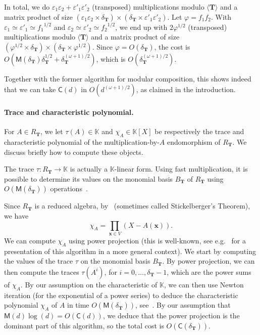 \documentclass[12pt]{article}
\def\CC {\ensuremath{\mathsf{C}}}
\def\K {\ensuremath{\mathbb{K}}}
\def\M {\ensuremath{\mathsf{M}}}
\def\Tt {\ensuremath{\mathbf{T}}}
\def\x {\ensuremath{\mathbf{x}}}
\begin{document}
In total, we do $\varepsilon_1 \varepsilon_2+\varepsilon'_1
\varepsilon'_2$ (transposed) multiplications modulo $\langle \Tt
\rangle$ and a matrix product of size $(\varepsilon_1 \varepsilon_2
\times \delta_\Tt) \times (\delta_\Tt \times \varepsilon'_1
\varepsilon'_2)$. Let $\varphi=f_1f_2$. With $\varepsilon_1 \simeq
\varepsilon'_1 \simeq {f_1}^{1/2}$ and $\varepsilon_2 \simeq
\varepsilon'_2 \simeq {f_2}^{1/2}$, we end up with $2\varphi^{1/2}$
(transposed) multiplications modulo $\langle \Tt \rangle$ and a matrix
product of size $ (\varphi^{1/2} \times \delta_\Tt) \times (\delta_\Tt
\times \varphi^{1/2})$. Since $\varphi=O(\delta_\Tt)$, the cost is
$O(\M(\delta_\Tt)\delta_\Tt^{1/2} + \delta_\Tt^{(\omega+1)/2})$, which
is $O(\delta_\Tt^{(\omega+1)/2})$.

Together with the former algorithm for modular composition, this shows
indeed that we can take $\CC(d)$ in $O(d^{(\omega+1)/2})$, as claimed
in the introduction.

\paragraph{Trace and characteristic polynomial.}
For $A \in R_\Tt$, we let $\tau(A)\in \K$ and $\chi_A \in \K[X]$ be
respectively the trace and characteristic polynomial of the
multiplication-by-$A$ endomorphism of $R_\Tt$. We discuss briefly how
to compute these objects.

The trace $\tau:R_\Tt \to \K$ is actually a $\K$-linear form. Using
fast multiplication, it is possible to determine its values on the
monomial basis $B_\Tt$ of $R_\Tt$ using $O(\M(\delta_\Tt))$
operations~\cite{PaSc06}.

Since $R_\Tt$ is a reduced algebra, by~\cite[Prop.~4.2.7]{CoLiSh98}
(sometimes called Stickelberger's Theorem), we have
\begin{equation}\label{eq:stick}
  \chi_A=\prod_{\x \in V}(X-A(\x)).  
\end{equation}
We can compute $\chi_A$ using power projection (this is well-known,
see e.g.~\cite{Rouillier99} for a presentation of this algorithm in a
more general context). We start by computing the values of the trace
$\tau$ on the monomial basis $B_\Tt$. By power projection, we can then
compute the traces $\tau(A^i)$, for $i=0,\dots,\delta_\Tt-1$, which
are the power sums of $\chi_A$. By our assumption on the
characteristic of $\K$, we can then use Newton iteration (for the
exponential of a power series) to deduce the characteristic polynomial
$\chi_A$ of $A$ in time $O(\M(\delta_\Tt))$,
see~\cite{BrKu78,Schonhage82}. By our assumption that $\M(d)\log(d) =
O(\CC(d))$, we deduce that the power projection is the dominant part
of this algorithm, so the total cost is $O(\CC(\delta_\Tt))$.
\end{document}
